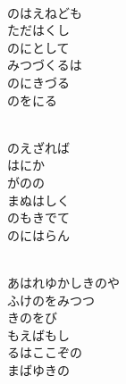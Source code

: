 \documentclass[10pt,b5j]{tarticle} %
\begin{document}
\begin{enumerate}
\begin{minipage}[c]{\blocksize}
        \vspace{\linespace}
        \item~\\
        のはえねども\\
        ただはくし\\
        のにとして\\
        みつづくるは\\
        のにきづる\\
        のをにる
        
    \end{minipage}
    \begin{minipage}[c]{\blocksize}
        
        \vspace{\linespace}
        \item~\\
        のえざれば\\
        はにか\\
        がのの\\
        まぬはしく\\
        のもきでて\\
        のにはらん
        
    \end{minipage}
    \begin{minipage}[c]{\blocksize}
        
        \vspace{\linespace}
        \item~\\
        あはれゆかしきのや\\
        ふけのをみつつ\\
        きのをび\\
        もえばもし\\
        るはここぞの\\
        まばゆきの
    
    \end{minipage}
\end{enumerate} %
\end{document}
